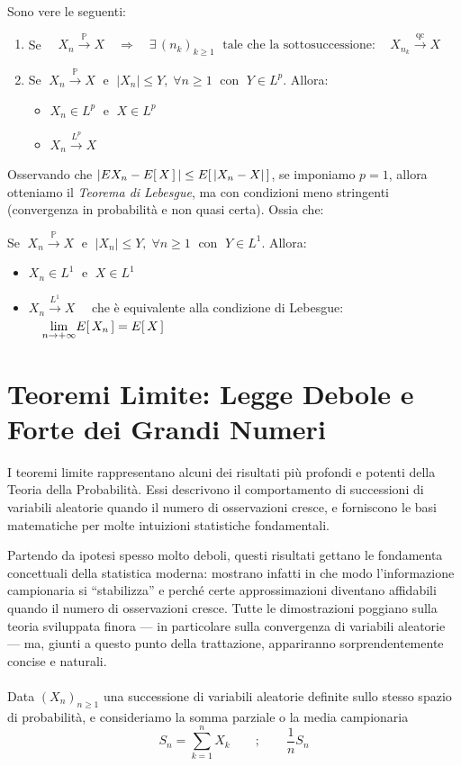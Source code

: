 \begin{teorema}
\label{th:15.13}
    Sono vere le seguenti:
    \begin{enumerate}
        \item Se $\quad X_n \overset{\mathbb{P}}{\longrightarrow}X \quad \Rightarrow\quad \exists\, (n_k)_{k\geq1}\;\text{ tale che la sottosuccessione}:\quad X_{n_k} \overset{\text{qc}}{\longrightarrow}X$
        \item Se $\;X_n \overset{\mathbb{P}}{\longrightarrow}X\;$ e $\;|X_n|\leq Y, \;\forall n\geq1\;$ con $\;Y\in L^p$. Allora:
        \begin{itemize}
            \item $X_n\in L^p\;$ e $\; X\in L^p$
            \item $X_n \overset{L^p}{\longrightarrow}X$
        \end{itemize}
    \end{enumerate}
\end{teorema}

Osservando che $|E{X_n}-E\!\left[\,X\,\right]|\leq E\!\left[\,|X_n-X|\,\right]$, se imponiamo $p=1$, allora otteniamo il \textit{Teorema di Lebesgue}, ma con condizioni meno stringenti (convergenza in probabilità e non quasi certa). Ossia che:

\bigskip
\noindent Se $\;X_n \overset{\mathbb{P}}{\longrightarrow}X\;$ e $\;|X_n|\leq Y, \;\forall n\geq1\;$ con $\;Y\in L^1$. Allora:
\begin{itemize}
    \item $X_n\in L^1\;$ e $\; X\in L^1$
    \item $X_n \overset{L^1}{\longrightarrow}X\quad$ che è equivalente alla condizione di Lebesgue: $\quad \underset{n\to+\infty}{\lim}E\!\left[\,X_n\,\right] = E\!\left[\,X\,\right]$
\end{itemize}

\section{Teoremi Limite: Legge Debole e Forte dei Grandi Numeri}

I teoremi limite rappresentano alcuni dei risultati più profondi e potenti della Teoria della Probabilità. Essi descrivono il comportamento di successioni di variabili aleatorie quando il numero di osservazioni cresce, e forniscono le basi matematiche per molte intuizioni statistiche fondamentali.

\medskip
Partendo da ipotesi spesso molto deboli, questi risultati gettano le fondamenta concettuali della statistica moderna: mostrano infatti in che modo l’informazione campionaria si “stabilizza” e perché certe approssimazioni diventano affidabili quando il numero di osservazioni cresce. Tutte le dimostrazioni poggiano sulla teoria sviluppata finora — in particolare sulla convergenza di variabili aleatorie — ma, giunti a questo punto della trattazione, appariranno sorprendentemente concise e naturali.\\
\\
Data $(X_n)_{n\geq 1}$ una successione di variabili aleatorie definite sullo
stesso spazio di probabilità, e consideriamo la somma parziale o la media campionaria
\[
    S_n = \sum_{k=1}^n X_k \qquad ;\qquad \frac{1}{n} S_n
\]

